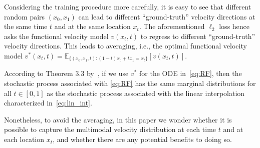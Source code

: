 Considering the training procedure more carefully, it is easy to see that different random pairs $(x_0,x_1)$ can lead to different ``ground-truth'' velocity directions at the same time $t$ and at the same location $x_t$. The aforementioned $\ell_2$ loss hence asks the functional velocity model $v(x_t,t)$ to regress to  different ``ground-truth'' velocity directions. This leads to averaging, i.e., the optimal functional velocity model $v^\ast(x_t,t) = \mathbb{E}_{\{(x_0,x_1,t):(1-t)x_0+tx_1 = x_t\}}\left[v(x_t,t)\right]$.

According to Theorem 3.3 by~\cite{liu2023flow}, if we use $v^\ast$ for the ODE in~\cref{eq:RF}, then the stochastic process associated with \cref{eq:RF} has the same marginal distributions for all $t \in [0, 1]$ as the stochastic process associated with the linear interpolation characterized in~\cref{eq:lin_int}.

Nonetheless, to avoid the averaging, in this paper we wonder whether it is possible to capture the multimodal velocity distribution at each time $t$ and at each location $x_t$, and whether there are any potential benefits to doing so.


